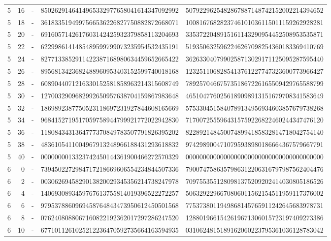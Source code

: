 \begin{longtable}{rrrll}
5 & 16 & - & 8502629146414965332977658041614347092992 & 5079229625482867887148742152002214394652 \\
5 & 18 & - & 3618335194997566536226827750882872668071 & 1008167682823746101036115011159262928281 \\
5 & 20 & - & 6916057142617603142425932379858113204693 & 3353722048915161143290954452508953535871 \\
5 & 22 & - & 6229986141485489599799073235954532435191 & 5193506325962246267098254360183369410769 \\
5 & 24 & - & 8277133852911422387168980634459652665422 & 3626330407990258713029171125095287595440 \\
5 & 26 & - & 8956813423682488960953403152599740018168 & 1232511068285413761227747323600773966427 \\
5 & 28 & - & 6089044071216330152581858963214315608749 & 7892570466757351867226165509429765588799 \\
5 & 30 & - & 1270032909682992650957638704159867983648 & 4651047760256189098913151679708341583649 \\
5 & 32 & - & 1869892387750523118697231927844608165669 & 5753304515840789134956934603857679738268 \\
5 & 34 & - & 9684152719517059758944799921772022942830 & 7170072555964315759226822460244347476120 \\
5 & 36 & - & 1180843431364777370849783507791826395202 & 8228921484500748994185832814718042754140 \\
5 & 38 & - & 4836105411004967913248966188431293618832 & 9742989004710795938980186664367579667791 \\
5 & 40 & - & 0000000013323742450144361900466272570329 & 0000000000000000000000000000000000000000 \\
6 & 0 & - & 7394502272984717218669606554234844507336 & 7900747586357986312206316797987562404476 \\
6 & 2 & - & 0030626945829013820029345356214738247978 & 7097553551280981375209202414030805186526 \\
6 & 4 & - & 1406930893459767613755814019396522272257 & 5063292296670806011562154511959117376002 \\
6 & 6 & - & 9795378860969458764843473950612450501568 & 7753738011949868145765911242645683978731 \\
6 & 8 & - & 0762408088067160822192362017297286247520 & 1288019661542619671306015723197409273386 \\
6 & 10 & - & 6771011261025212236470592735664163594935 & 0310624815189162060223795361036128783042 \\

\end{longtable}
